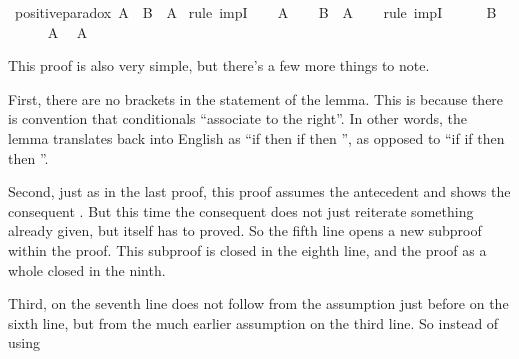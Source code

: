 \begin{isabellebody}
\ positive{\isacharunderscore}paradox{\isacharcolon}\ {\isachardoublequoteopen}A\ {\isasymlongrightarrow}\ B\ {\isasymlongrightarrow}\ A{\isachardoublequoteclose}\isanewline
%
\isadelimproof
%
\endisadelimproof
%
\isatagproof
{}\isamarkupfalse%
\ {\isacharparenleft}rule\ impI{\isacharparenright}\isanewline
\ \ \isamarkupfalse%
\ {\isachardoublequoteopen}A{\isachardoublequoteclose}\isanewline
\ \ \isamarkupfalse%
\ {\isachardoublequoteopen}B\ {\isasymlongrightarrow}\ A{\isachardoublequoteclose}\isanewline
\ \ \isamarkupfalse%
\ {\isacharparenleft}rule\ impI{\isacharparenright}\isanewline
\ \ \ \ \isamarkupfalse%
\ {\isachardoublequoteopen}B{\isachardoublequoteclose}\isanewline
\ \ \ \ \isamarkupfalse%
\ {\isacharbackquoteopen}A{\isacharbackquoteclose}\ \isamarkupfalse%
\ {\isachardoublequoteopen}A{\isachardoublequoteclose}\isacommand{{\isachardot}}\isamarkupfalse%
\isanewline
\ \ \isamarkupfalse%
\isanewline
{}\isamarkupfalse%
%
\endisatagproof
{\isafoldproof}%
%
\isadelimproof
%
\endisadelimproof
%
\begin{isamarkuptext}%
This proof is also very simple, but there's a few more things to note.%
\end{isamarkuptext}\isamarkuptrue%
%
\begin{isamarkuptext}%
First, there are no brackets in the statement of the lemma. This is because there is 
convention that conditionals ``associate to the right''. In other words, the lemma translates back
into English as ``if  then if   then  '', as opposed to ``if if
  then  then ''.%
\end{isamarkuptext}\isamarkuptrue%
%
\begin{isamarkuptext}%
Second, just as in the last proof, this proof assumes the antecedent  and shows
the consequent . But this time the consequent does not just reiterate something
already given, but itself has to proved. So the fifth line opens a new subproof within the proof. 
This subproof is closed in the eighth line, and the proof as a whole closed in the ninth.%
\end{isamarkuptext}\isamarkuptrue%
%
\begin{isamarkuptext}%
Third, on the seventh line   does not follow from the assumption just before on
the sixth line, but from the much earlier assumption on the third line. So instead of using 

\end{isamarkuptext}
\end{isabellebody}
